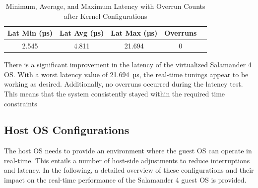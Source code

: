 \documentclass[MMR,Master,english]{style/twbook}
\begin{document}
\begin{table}[H]
	\centering
	\caption[Latency Statistics with Overrun Counts after Kernel Configurations]{Minimum, Average, and Maximum Latency with Overrun Counts after Kernel Configurations}
	\label{tab:latency_overrun_msw_new_virt_kernel}
	\begin{tabular}{|c|c|c|c|c|}
		\hline
		\textbf{Lat Min (µs)} & \textbf{Lat Avg (µs)} & \textbf{Lat Max (µs)} & \textbf{Overruns} \\ \hline
		2.545                 & 4.811                 & 21.694                & 0                 \\ \hline
	\end{tabular}
\end{table}

\noindent There is a significant improvement in the latency of the virtualized Salamander 4 OS. With a worst latency value of 21.694~µs, the real-time tunings appear to be working as desired. Additionally, no overruns occurred during the latency test. This means that the system consistently stayed within the required time constraints

\clearpage

\subsection{Host OS Configurations}\label{subsec:host_configurations}
The host OS needs to provide an environment where the guest OS can operate in real-time. This entails a number of host-side adjustments to reduce interruptions and latency. In the following, a detailed overview of these configurations and their impact on the real-time performance of the Salamander 4 guest OS is provided.
\end{document}
